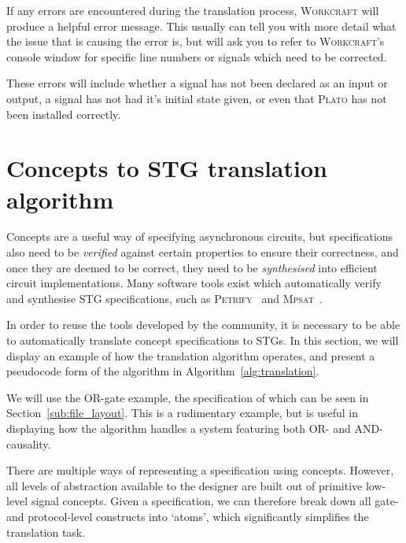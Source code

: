 \documentclass[british,conference,compsoc]{IEEEtran}
\newcommand{\noun}[1]{\textsc{#1}}
\begin{document}
If any errors are encountered during the translation process, \noun{Workcraft} 
will produce a helpful error message. This usually can tell you with more 
detail what the issue that is causing the error is, but will ask you to refer 
to \noun{Workcraft}'s console window for specific line numbers or signals which
need to be corrected. 

These errors will include whether a signal has not been declared as an input or
output, a signal has not had it's initial state given, or even that \noun{Plato}
has not been installed correctly. 

\vspace{-3mm}

\section{Concepts to STG translation algorithm\label{sec:algorithm}}

\vspace{-2mm}

Concepts are a useful way of specifying asynchronous circuits, but
specifications also need to be \emph{verified} against certain properties to
ensure their correctness, and once they are deemed to be correct, they need to
be \emph{synthesised} into efficient circuit implementations. Many software
tools exist which automatically verify and synthesise STG specifications,
such as \noun{Petrify}~\cite{Cortadella} and
\noun{Mpsat}~\cite{khomenko2004detecting}.

In order to reuse the tools developed by the community, it is
necessary to be able to automatically translate concept specifications to STGs.
In this section, we will display an example of how the translation algorithm 
operates, and present a pseudocode form of the algorithm in 
Algorithm~\ref{alg:translation}. 

We will use the OR-gate example, the specification of which can be seen in 
Section~\ref{sub:file_layout}. This is a rudimentary example, but is useful in 
displaying how the algorithm handles a system featuring both OR- and 
AND-causality.

There are multiple ways of representing a specification using concepts. However,
all levels of abstraction available to the designer are built out of primitive 
low-level signal concepts. Given a specification, we can therefore break down 
all gate- and protocol-level constructs into `atoms', which significantly 
simplifies the translation task.
\end{document}

